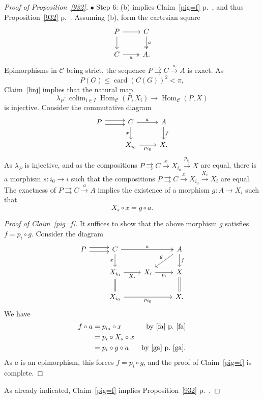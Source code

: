 \documentclass[12pt]{article}
\theoremstyle{remark}
\theoremstyle{definition}
\newcommand{\bu}{\bullet}
\newcommand{\nn}{\noindent}
\newcommand{\C}{\mathcal C}
\newcommand{\parar}{\rightrightarrows}
\newcommand{\xr}{\xrightarrow}
\DeclareMathOperator*{\colim}{colim}
\DeclareMathOperator{\card}{card}
\DeclareMathOperator{\Hom}{Hom}
\begin{document}
\begin{proof}[Proof of Proposition~\ref{932}]
\nn$\bu$ Step 6: (b) implies Claim~\ref{pig=f} p.~\pageref{pig=f}, and thus Proposition~\ref{932} p.~\pageref{932}. Assuming (b), form the cartesian square 
$$
\begin{tikzcd}
P\ar{r}\ar{d}&C\ar[two heads]{d}{a}\\ 
C\ar[two heads]{r}[swap]{a}&A.
\end{tikzcd}
$$
Epimorphisms in $\C$ being strict, the sequence $P\parar C\xr aA$ is exact. As 
$$
P(G)\le\card(C(G))^2<\pi,
$$ 
Claim~\ref{linj} implies that the natural map 
$$
\lambda_P:\colim_{i\in I}\Hom_\C(P,X_i)\to\Hom_\C(P,X)
$$ 
is injective. Consider the commutative diagram 
$$
\begin{tikzcd}
P\ar[yshift=0.7ex]{r}\ar[yshift=-0.7ex]{r}&C\ar{r}{a}\ar{d}[swap]{x}&A\ar{d}{f}\\ 
{}&X_{i_0}\ar{r}[swap]{p_{i_0}}&X.
\end{tikzcd}
$$ 
As $\lambda_P$ is injective, and as the compositions $P\parar C\xr xX_{i_0}\xr{p_{i_0}}X$ are equal, there is a morphism $s:i_0\to i$ such that the compositions $P\parar C\xr xX_{i_0}\xr{X_s} X_i$ are equal. The exactness of $P\parar C\xr aA$ implies the existence of a morphism $g:A\to X_i$ such that 
%
\begin{equation}\label{ga}
X_s\circ x=g\circ a.
\end{equation} 
% 

\begin{proof}[Proof of Claim~\ref{pig=f}]
It suffices to show that the above morphism $g$ satisfies $f=p_i\circ g$. Consider the diagram 
$$
\begin{tikzcd}
P\ar[yshift=0.7ex]{r}\ar[yshift=-0.7ex]{r}&C\ar{d}[swap]{x}\ar[two heads]{rr}{a}&&A\ar{dl}[swap]{g}\ar{d}{f}\\ 
{}&X_{i_0}\ar{r}[swap]{X_s}\ar[equal]{d}&X_i\ar{r}[swap]{p_i}&X\ar[equal]{d}\\ 
{}&X_{i_0}\ar{rr}[swap]{p_{i_0}}&&X.
\end{tikzcd}
$$ 
We have 
%
\begin{align*}
f\circ a&=p_{i_0}\circ x&\text{by \eqref{fa} p.~\pageref{fa}}\\ 
&=p_i\circ X_s\circ x\\ 
&=p_i\circ g\circ a&\text{by \eqref{ga} p.~\pageref{ga}}.
\end{align*}
%
As $a$ is an epimorphism, this forces $f=p_i\circ g$, and the proof of Claim~\ref{pig=f} is complete. 
\end{proof} 

As already indicated, Claim~\ref{pig=f} implies Proposition~\ref{932} p.~\pageref{932}. 
\end{proof}  
\end{document}
